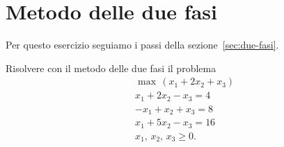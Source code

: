 \section{Metodo delle due fasi}\label{sec:es-due-fasi}
Per questo esercizio seguiamo i passi della sezione~\ref{sec:due-fasi}.

\begin{esercizio}
Risolvere con il metodo delle due fasi il problema
\[
\begin{aligned}
&\max\, (x_1 + 2x_2 + x_3) \\
&x_1 + 2x_2 - x_3 = 4 \\
&{-x_1} + x_2 + x_3 = 8 \\
&x_1 + 5x_2 - x_3 = 16 \\
&x_1,\, x_2,\, x_3 \ge 0.
\end{aligned}
\]
\end{esercizio}

